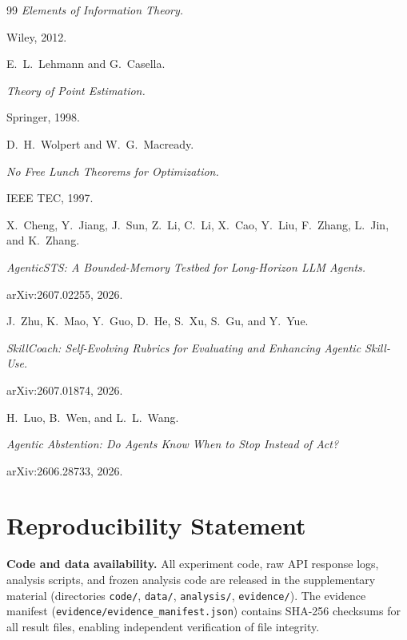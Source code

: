 \documentclass[11pt]{article}
\begin{document}
\begin{thebibliography}{99}
\newblock \textit{Elements of Information Theory.}

\newblock Wiley, 2012.

 E.~L.~Lehmann and G.~Casella.

\newblock \textit{Theory of Point Estimation.}

\newblock Springer, 1998.

 D.~H.~Wolpert and W.~G.~Macready.

\newblock \textit{No Free Lunch Theorems for Optimization.}

\newblock IEEE TEC, 1997.

 X.~Cheng, Y.~Jiang, J.~Sun, Z.~Li, C.~Li, X.~Cao, Y.~Liu, F.~Zhang, L.~Jin, and K.~Zhang.

\newblock \textit{AgenticSTS: A Bounded-Memory Testbed for Long-Horizon LLM Agents.}

\newblock arXiv:2607.02255, 2026.

 J.~Zhu, K.~Mao, Y.~Guo, D.~He, S.~Xu, S.~Gu, and Y.~Yue.

\newblock \textit{SkillCoach: Self-Evolving Rubrics for Evaluating and Enhancing Agentic Skill-Use.}

\newblock arXiv:2607.01874, 2026.

 H.~Luo, B.~Wen, and L.~L.~Wang.

\newblock \textit{Agentic Abstention: Do Agents Know When to Stop Instead of Act?}

\newblock arXiv:2606.28733, 2026.

\end{thebibliography}


\section*{Reproducibility Statement}
\label{sec:reproducibility}

\textbf{Code and data availability.} All experiment code, raw API response logs, analysis scripts, and frozen analysis code are released in the supplementary material (directories \texttt{code/}, \texttt{data/}, \texttt{analysis/}, \texttt{evidence/}). The evidence manifest (\texttt{evidence/evidence\_manifest.json}) contains SHA-256 checksums for all result files, enabling independent verification of file integrity.
\end{document}
